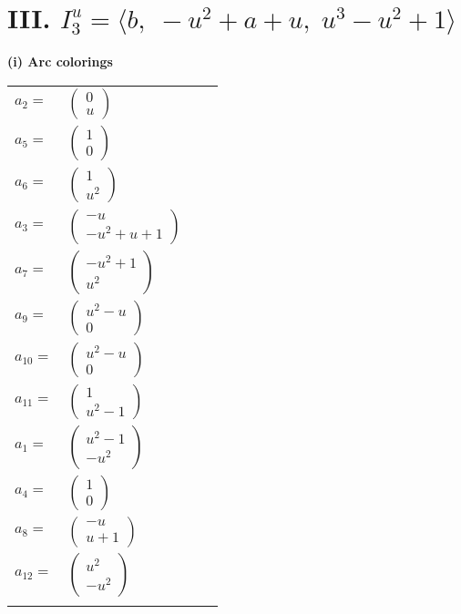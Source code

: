 \documentclass[1p]{elsarticle_modified}
\theoremstyle{definition}
\begin{document}
\centering \section*{III. $I^u_{3}= \langle b,\;- u^2+a+u,\;u^3- u^2+1 \rangle$}
\flushleft \textbf{(i) Arc colorings}\\
\begin{tabular}{m{7pt} m{180pt} m{7pt} m{180pt} }
\flushright $a_{2}=$&$\begin{pmatrix}0\\u\end{pmatrix}$ \\
\flushright $a_{5}=$&$\begin{pmatrix}1\\0\end{pmatrix}$ \\
\flushright $a_{6}=$&$\begin{pmatrix}1\\u^2\end{pmatrix}$ \\
\flushright $a_{3}=$&$\begin{pmatrix}- u\\- u^2+u+1\end{pmatrix}$ \\
\flushright $a_{7}=$&$\begin{pmatrix}- u^2+1\\u^2\end{pmatrix}$ \\
\flushright $a_{9}=$&$\begin{pmatrix}u^2- u\\0\end{pmatrix}$ \\
\flushright $a_{10}=$&$\begin{pmatrix}u^2- u\\0\end{pmatrix}$ \\
\flushright $a_{11}=$&$\begin{pmatrix}1\\u^2-1\end{pmatrix}$ \\
\flushright $a_{1}=$&$\begin{pmatrix}u^2-1\\- u^2\end{pmatrix}$ \\
\flushright $a_{4}=$&$\begin{pmatrix}1\\0\end{pmatrix}$ \\
\flushright $a_{8}=$&$\begin{pmatrix}- u\\u+1\end{pmatrix}$ \\
\flushright $a_{12}=$&$\begin{pmatrix}u^2\\- u^2\end{pmatrix}$\\&\end{tabular}
\end{document}
